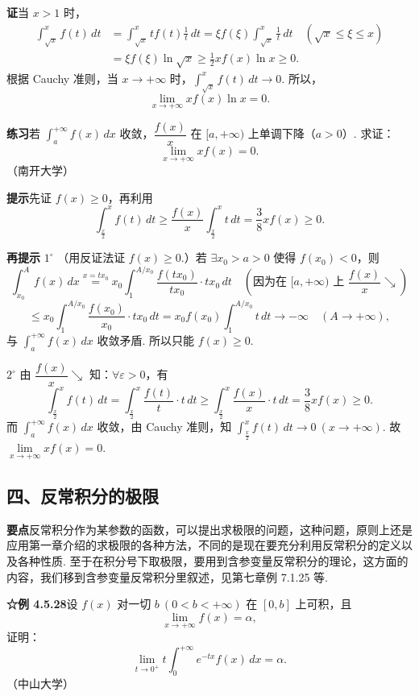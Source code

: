 \documentclass[UTF8, 12pt, fontset=fandol, oneside]{ctexart}
\begin{document}
\noindent\textbf{证}\quad 当 $x>1$ 时，
\[
\begin{aligned}
\int_{\sqrt x}^{x}f(t)\,dt
&=\int_{\sqrt x}^{x}tf(t)\frac1t\,dt
=\xi f(\xi)\int_{\sqrt x}^{x}\frac1t\,dt\quad(\sqrt x\le\xi\le x)\\
&=\xi f(\xi)\ln\sqrt x
\ge\frac12xf(x)\ln x\ge0.
\end{aligned}
\]
根据 Cauchy 准则，当 $x\to+\infty$ 时，$\displaystyle\int_{\sqrt x}^{x}f(t)\,dt\to0$. 所以，
\[
\lim_{x\to+\infty}xf(x)\ln x=0.
\]

\noindent\textbf{练习}\quad 若 $\displaystyle\int_a^{+\infty}f(x)\,dx$ 收敛，$\dfrac{f(x)}x$ 在 $[a,+\infty)$ 上单调下降（$a>0$）. 求证：
\[
\lim_{x\to+\infty}xf(x)=0.
\]
（南开大学）

\noindent\textbf{提示}\quad 先证 $f(x)\ge0$，再利用
\[
\int_{\frac x2}^{x}f(t)\,dt
\ge\frac{f(x)}x\int_{\frac x2}^{x}t\,dt
=\frac38xf(x)\ge0.
\]

\noindent\textbf{再提示}\quad
$1^\circ$ （用反证法证 $f(x)\ge0$.）若 $\exists x_0>a>0$ 使得 $f(x_0)<0$，则
\[
\int_{x_0}^A f(x)\,dx
\stackrel{x=tx_0}{=}x_0\int_1^{A/x_0}\frac{f(tx_0)}{tx_0}\cdot tx_0\,dt
\quad\left(\text{因为在 }[a,+\infty)\text{ 上 }\frac{f(x)}x\searrow\right)
\]
\[
\le x_0\int_1^{A/x_0}\frac{f(x_0)}{x_0}\cdot tx_0\,dt
=x_0f(x_0)\int_1^{A/x_0}t\,dt\to-\infty\quad(A\to+\infty),
\]
与 $\displaystyle\int_a^{+\infty}f(x)\,dx$ 收敛矛盾. 所以只能 $f(x)\ge0$.

$2^\circ$ 由 $\dfrac{f(x)}x\searrow$ 知：$\forall\varepsilon>0$，有
\[
\int_{\frac x2}^{x}f(t)\,dt
=\int_{\frac x2}^{x}\frac{f(t)}t\cdot t\,dt
\ge\int_{\frac x2}^{x}\frac{f(x)}x\cdot t\,dt
=\frac38xf(x)\ge0.
\]
而 $\displaystyle\int_a^{+\infty}f(x)\,dx$ 收敛，由 Cauchy 准则，知 $\displaystyle\int_{\frac x2}^{x}f(t)\,dt\to0\ (x\to+\infty)$. 故 $\lim\limits_{x\to+\infty}xf(x)=0$.

\subsection*{四、反常积分的极限}

\noindent\textbf{要点}\quad 反常积分作为某参数的函数，可以提出求极限的问题，这种问题，原则上还是应用第一章介绍的求极限的各种方法，不同的是现在要充分利用反常积分的定义以及各种性质. 至于在积分号下取极限，要用到含参变量反常积分的理论，这方面的内容，我们移到含参变量反常积分里叙述，见第七章例 7.1.25 等.

\noindent\textbf{☆例 4.5.28}\quad 设 $f(x)$ 对一切 $b\ (0<b<+\infty)$ 在 $[0,b]$ 上可积，且
\[
\lim_{x\to+\infty}f(x)=\alpha,
\]
证明：
\[
\lim_{t\to0^+}t\int_0^{+\infty}e^{-tx}f(x)\,dx=\alpha. \tag{1}
\]
（中山大学）
\end{document}
